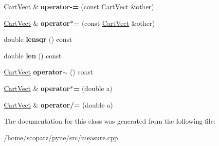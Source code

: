 \begin{DoxyCompactItemize}
\item 
\hypertarget{class_cart_vect_a459252305cedf4e95a997bd46a26e9b8}{\hyperlink{class_cart_vect}{Cart\-Vect} \& {\bfseries operator-\/=} (const \hyperlink{class_cart_vect}{Cart\-Vect} \&other)}\label{class_cart_vect_a459252305cedf4e95a997bd46a26e9b8}

\item 
\hypertarget{class_cart_vect_ae4d813aaf367f7260870b051062a776f}{\hyperlink{class_cart_vect}{Cart\-Vect} \& {\bfseries operator$\ast$=} (const \hyperlink{class_cart_vect}{Cart\-Vect} \&other)}\label{class_cart_vect_ae4d813aaf367f7260870b051062a776f}

\item 
\hypertarget{class_cart_vect_a9ab6e8cdf915cde3cf166a6c8c10ce17}{double {\bfseries lensqr} () const }\label{class_cart_vect_a9ab6e8cdf915cde3cf166a6c8c10ce17}

\item 
\hypertarget{class_cart_vect_a4809574b9b0bc24075da36e5b60e6988}{double {\bfseries len} () const }\label{class_cart_vect_a4809574b9b0bc24075da36e5b60e6988}

\item 
\hypertarget{class_cart_vect_aeafa9899c84e5ed65f3217fc1217e7a2}{\hyperlink{class_cart_vect}{Cart\-Vect} {\bfseries operator$\sim$} () const }\label{class_cart_vect_aeafa9899c84e5ed65f3217fc1217e7a2}

\item 
\hypertarget{class_cart_vect_a3dec977a311cf363e0ce7f2983370b10}{\hyperlink{class_cart_vect}{Cart\-Vect} \& {\bfseries operator$\ast$=} (double a)}\label{class_cart_vect_a3dec977a311cf363e0ce7f2983370b10}

\item 
\hypertarget{class_cart_vect_aaf0806de8642163882bc844e55fa921f}{\hyperlink{class_cart_vect}{Cart\-Vect} \& {\bfseries operator/=} (double a)}\label{class_cart_vect_aaf0806de8642163882bc844e55fa921f}

\end{DoxyCompactItemize}


The documentation for this class was generated from the following file\-:\begin{DoxyCompactItemize}
\item 
/home/scopatz/pyne/src/measure.\-cpp\end{DoxyCompactItemize}
